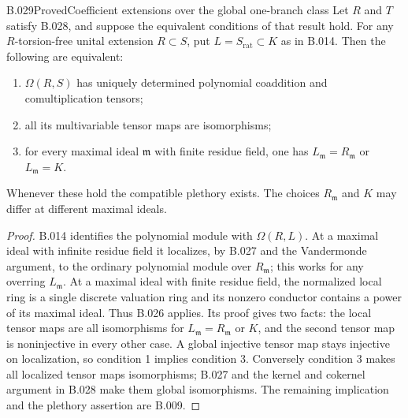 \begin{saresult}{B.029}{Proved}{Coefficient extensions over the global one-branch class}
Let $R$ and $T$ satisfy B.028, and suppose the equivalent conditions
of that result hold. For any $R$-torsion-free unital extension
$R\subset S$, put $L=S_{\mathrm{rat}}\subset K$ as in B.014.
Then the following are equivalent:
\begin{enumerate}
\item $\Omega(R,S)$ has uniquely determined polynomial
coaddition and comultiplication tensors;
\item all its multivariable tensor maps are isomorphisms;
\item for every maximal ideal $\mathfrak m$ with finite residue
field, one has $L_{\mathfrak m}=R_{\mathfrak m}$ or
$L_{\mathfrak m}=K$.
\end{enumerate}
Whenever these hold the compatible plethory exists. The choices
$R_{\mathfrak m}$ and $K$ may differ at different maximal ideals.
\end{saresult}
\begin{proof}
B.014 identifies the polynomial module with $\Omega(R,L)$.
At a maximal ideal with infinite residue field it localizes,
by B.027 and the Vandermonde argument, to the ordinary polynomial
module over $R_{\mathfrak m}$; this works for any overring
$L_{\mathfrak m}$. At a maximal ideal with finite residue field,
the normalized local ring is a single discrete valuation ring
and its nonzero conductor contains a power of its maximal ideal.
Thus B.026 applies. Its proof gives two facts: the local tensor
maps are all isomorphisms for $L_{\mathfrak m}=R_{\mathfrak m}$
or $K$, and the second tensor map is noninjective in every other
case. A global injective tensor map stays injective on localization,
so condition 1 implies condition 3. Conversely condition 3 makes
all localized tensor maps isomorphisms; B.027 and the kernel and
cokernel argument in B.028 make them global isomorphisms.
The remaining implication and the plethory assertion are B.009.
\end{proof}


